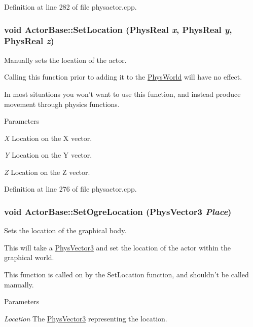 Definition at line 282 of file physactor.cpp.

\hypertarget{classActorBase_a34848d620c5d9d2796999edbdcb77c9a}{
\subsubsection[{SetLocation}]{\setlength{\rightskip}{0pt plus 5cm}void ActorBase::SetLocation (PhysReal {\em x}, \/  PhysReal {\em y}, \/  PhysReal {\em z})}}
\label{dd/d7b/classActorBase_a34848d620c5d9d2796999edbdcb77c9a}


Manually sets the location of the actor. 

Calling this function prior to adding it to the \hyperlink{classPhysWorld}{PhysWorld} will have no effect. \par
 In most situations you won't want to use this function, and instead produce movement through physics functions. 
\begin{DoxyParams}{Parameters}
\item[{\em X}]Location on the X vector. \item[{\em Y}]Location on the Y vector. \item[{\em Z}]Location on the Z vector. \end{DoxyParams}


Definition at line 276 of file physactor.cpp.

\hypertarget{classActorBase_a3140cc5c1c630efc1c04c20ada319b8b}{
\subsubsection[{SetOgreLocation}]{\setlength{\rightskip}{0pt plus 5cm}void ActorBase::SetOgreLocation ({\bf PhysVector3} {\em Place})}}
\label{dd/d7b/classActorBase_a3140cc5c1c630efc1c04c20ada319b8b}


Sets the location of the graphical body. 

This will take a \hyperlink{classPhysVector3}{PhysVector3} and set the location of the actor within the graphical world. \par
 This function is called on by the SetLocation function, and shouldn't be called manually. 
\begin{DoxyParams}{Parameters}
\item[{\em Location}]The \hyperlink{classPhysVector3}{PhysVector3} representing the location. \end{DoxyParams}


